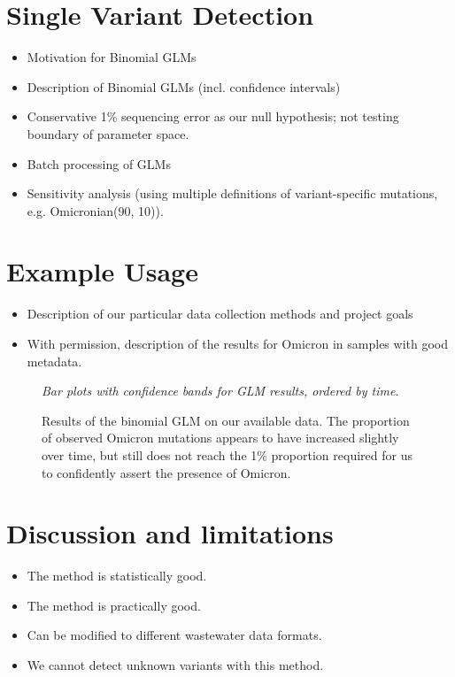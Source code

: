 \documentclass{article}
\newenvironment{tightemize}
{ \begin{itemize}
    \setlength{\itemsep}{0pt}
    \setlength{\parskip}{0pt}
    \setlength{\parsep}{0pt}     }
{ \end{itemize}                  }
\begin{document}
\section{Single Variant Detection}

\begin{tightemize}
    \item Motivation for Binomial GLMs
    \item Description of Binomial GLMs (incl. confidence intervals)
    \item Conservative 1\% sequencing error as our null hypothesis; not testing boundary of parameter space.
    \item Batch processing of GLMs
    \item Sensitivity analysis (using multiple definitions of variant-specific mutations, e.g. Omicronian(90, 10)).
\end{tightemize}






\section{Example Usage}

\begin{tightemize}
    \item Description of our particular data collection methods and project goals
    \item With permission, description of the results for Omicron in samples with good metadata.
\end{tightemize}

\begin{figure}[ht!]
\vspace{2cm}
\centering
\emph{Bar plots with confidence bands for GLM results, ordered by time.}
\vspace{2cm}
\caption{Results of the binomial GLM on our available data. The proportion of observed Omicron mutations appears to have increased slightly over time, but still does not reach the 1\% proportion required for us to confidently assert the presence of Omicron.}
\label{fig:binomial_results}
\end{figure}


\section{Discussion and limitations}

\begin{tightemize}
    \item The method is statistically good.
    \item The method is practically good.
    \item Can be modified to different wastewater data formats.
    \item We cannot detect unknown variants with this method.
\end{tightemize}


{}

\end{document}
